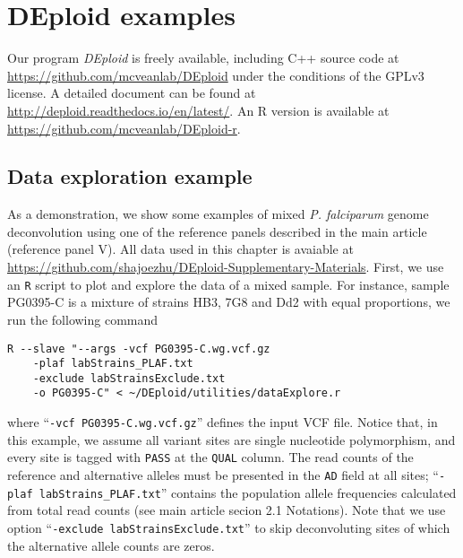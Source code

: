 


\section{DEploid examples} \label{sup:sec:deploid}

Our program {\it DEploid } is freely available, including C++ source code at \url{https://github.com/mcveanlab/DEploid} under the conditions of the GPLv3 license. A detailed document can be found at \url{http://deploid.readthedocs.io/en/latest/}. An R version is available at \url{https://github.com/mcveanlab/DEploid-r}.

\subsection{Data exploration example}
As a demonstration, we show some examples of mixed {\em P. falciparum} genome deconvolution using one of the reference panels described in the main article (reference panel V). All data used in this chapter is avaiable at \url{https://github.com/shajoezhu/DEploid-Supplementary-Materials}. First, we use an {\tt R} script to plot and explore the data of a mixed sample. For instance, sample {\textmd PG0395-C} is a mixture of strains HB3, 7G8 and Dd2 with equal proportions, we run the following command
\linespread{1}
\begin{lstlisting}
R --slave "--args -vcf PG0395-C.wg.vcf.gz
    -plaf labStrains_PLAF.txt
    -exclude labStrainsExclude.txt
    -o PG0395-C" < ~/DEploid/utilities/dataExplore.r
\end{lstlisting}
\linespread{1.5}
where ``{\tt -vcf PG0395-C.wg.vcf.gz}'' defines the input VCF file. Notice that, in this example, we assume all variant sites are single nucleotide polymorphism, and every site is tagged with {\tt PASS} at the {\tt QUAL} column. The read counts of the reference and alternative alleles must be presented in the {\tt AD} field at all sites; ``{\tt -plaf labStrains\_PLAF.txt}'' contains the population allele frequencies calculated from total read counts (see main article secion 2.1 Notations). Note that we use option ``{\tt -exclude labStrainsExclude.txt}'' to skip deconvoluting sites of which the alternative allele counts are zeros.

